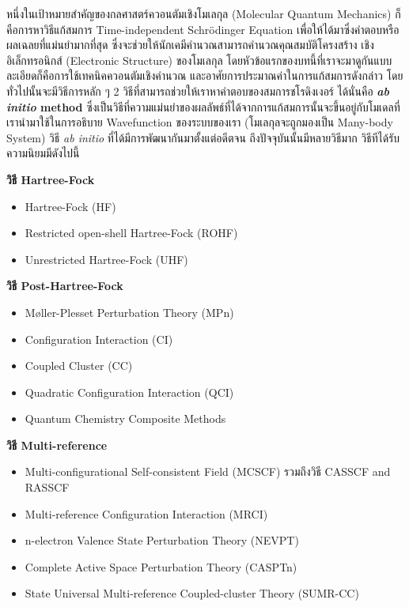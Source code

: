 หนึ่งในเป้าหมายสำคัญของกลศาสตร์ควอนตัมเชิงโมเลกุล (Molecular Quantum Mechanics) ก็คือการหาวิธีแก้สมการ Time-independent 
Schr\"{o}dinger Equation เพื่อให้ได้มาซึ่งคำตอบหรือผลเฉลยที่แม่นยำมากที่สุด ซึ่งจะช่วยให้นักเคมีคำนวณสามารถคำนวณคุณสมบัติโครงสร้าง%
เชิงอิเล็กทรอนิกส์ (Electronic Structure) ของโมเลกุล โดยหัวข้อแรกของบทนี้ที่เราจะมาดูกันแบบละเอียดก็คือการใช้เทคนิคควอนตัมเชิงคำนวณ%
และอาศัยการประมาณค่าในการแก้สมการดังกล่าว โดยทั่วไปนั้นจะมีวิธีการหลัก ๆ 2 วิธีที่สามารถช่วยให้เราหาคำตอบของสมการชโรดิงเงอร์ ได้นั่นคือ 
\textbf{\textit{ab initio} method} ซึ่งเป็นวิธีที่ความแม่นยำของผลลัพธ์ที่ได้จากการแก้สมการนั้นจะขึ้นอยู่กับโมเดลที่เรานำมาใช้ในการอธิบาย 
Wavefunction ของระบบของเรา (โมเลกุลจะถูกมองเป็น Many-body System) วิธี \textit{ab initio} ที่ได้มีการพัฒนากันมาตั้งแต่อดีตจน%
ถึงปัจจุบันนั้นมีหลายวิธีมาก\autocite{friesner2005,helgaker2014,jensen2017} วิธีทีได้รับความนิยมมีดังไปนี้

\noindent \textbf{วิธี Hartree-Fock}
\begin{itemize}[topsep=0pt,noitemsep]
    \item Hartree-Fock (HF)
    \item Restricted open-shell Hartree-Fock (ROHF)
    \item Unrestricted Hartree-Fock (UHF)
\end{itemize}

\noindent \textbf{วิธี Post-Hartree-Fock}
\begin{itemize}[topsep=0pt,noitemsep]
    \item Møller-Plesset Perturbation Theory (MPn)
    \item Configuration Interaction (CI)
    \item Coupled Cluster (CC)
    \item Quadratic Configuration Interaction (QCI)
    \item Quantum Chemistry Composite Methods
\end{itemize}

\noindent \textbf{วิธี Multi-reference}
\begin{itemize}[topsep=0pt,noitemsep]
    \item Multi-configurational Self-consistent Field (MCSCF) รวมถึงวิธี CASSCF and RASSCF
    \item Multi-reference Configuration Interaction (MRCI)
    \item n-electron Valence State Perturbation Theory (NEVPT)
    \item Complete Active Space Perturbation Theory (CASPTn)
    \item State Universal Multi-reference Coupled-cluster Theory (SUMR-CC)
\end{itemize}

